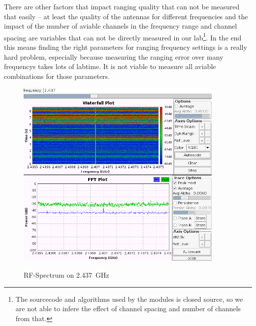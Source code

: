 There are other factors that impact ranging quality that can not be measured that easily – at least the quality of the antennas for different frequencies and the impact of the number of aviable channels in the frequency range and channel spacing are variables that can not be directly measured in our lab\footnote{The sourcecode and algorithms used by the modules is closed source, so we are not able to infere the effect of channel spacing and number of channels from that.}. 
In the end this means finding the right parameters for ranging frequency settings is a really hard problem, especially because measuring the ranging error over many frequencys takes lots of labtime. 
It is not viable to measure all aviable combinations for those parameters.


\begin{figure}[H]
	\centering
\includegraphics[width=0.9\textwidth]{figures/ch6.png}
\label{spectrum2437}
\caption{RF-Spectrum on \SI{2.437}{\giga\hertz}}
\end{figure}

